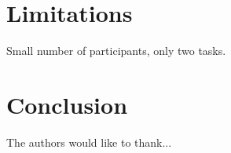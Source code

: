 \documentclass[conference]{IEEEtran}
\newcommand{\toolName}{Flower}
\begin{document}
	




\section{Limitations}

Small number of participants, only two tasks. 

\section{Conclusion}


The authors would like to thank...













\end{document}
